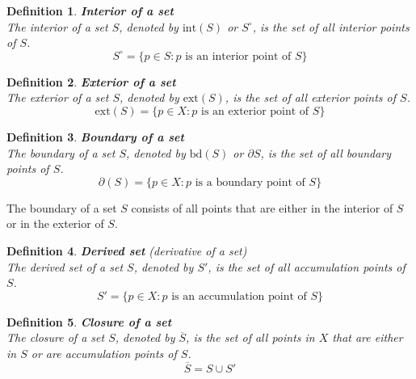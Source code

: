 \documentclass[11pt]{book} %
\newtheorem{definition}{Definition}[section]
\begin{document}
\begin{definition}{\textbf{Interior of a set}} \\
    The interior of a set \( S \), denoted by \( \text{int}(S) \) or \( S^\circ \), is the set of all interior points of \( S \).
    \begin{equation*}
        S^\circ = \{ p \in S : p \text{ is an interior point of } S \}
    \end{equation*}
\end{definition}


\begin{definition}{\textbf{Exterior of a set}} \\
    The exterior of a set \( S \), denoted by \( \text{ext}(S) \), is the set of all exterior points of \( S \).
    \begin{equation*}
        \text{ext}(S) = \{ p \in X : p \text{ is an exterior point of } S \}
    \end{equation*}
\end{definition}

\begin{definition}{\textbf{Boundary of a set}} \\
    The boundary of a set \( S \), denoted by \( \text{bd}(S) \) or \( \partial S \), is the set of all boundary points of \( S \).
    \begin{equation*}
        \partial(S) = \{ p \in X : p \text{ is a boundary point of } S \}
    \end{equation*}
\end{definition}

The boundary of a set \( S \) consists of all points that are either in the interior of \( S \) or in the exterior of \( S \).


\begin{definition}{\textbf{Derived set} (derivative of a set)} \\
    The derived set of a set \( S \), denoted by \( S' \), is the set of all accumulation points of \( S \).
    \begin{equation*}
        S' = \{ p \in X : p \text{ is an accumulation point of } S \}
    \end{equation*}
\end{definition}

\begin{definition}{\textbf{Closure of a set}} \\
    The closure of a set \( S \), denoted by \( \overline{S} \), is the set of all points in \( X \) that are either in \( S \) or are accumulation points of \( S \).
    \begin{equation*}
        \overline{S} = S \cup S'
    \end{equation*}
\end{definition}
\end{document}
